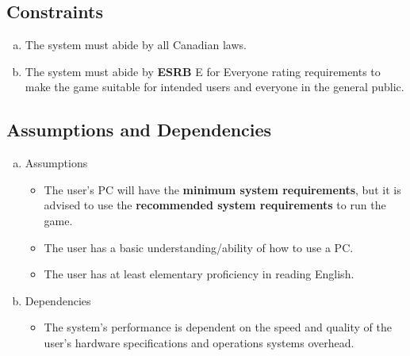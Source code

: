 \documentclass[]{article}
\begin{document}
\subsection{Constraints}
\label{sub:constraints}
\begin{enumerate}[a)]
	\item The system must abide by all Canadian laws.
	\item The system must abide by \textbf{ESRB} E for Everyone rating requirements to make the game suitable for intended users and everyone in the general public.
\end{enumerate}


\subsection{Assumptions and Dependencies}
\label{sub:assumptions_and_dependencies}


\begin{enumerate}[a)]
	\item Assumptions
	\begin{itemize}
		\item The user's PC will have the \textbf{minimum system requirements}, but it is advised to use the \textbf{recommended system requirements} to run the game.
		\item The user has a basic understanding/ability of how to use a PC.
		\item The user has at least elementary proficiency in reading English.
	\end{itemize}
	\item Dependencies
	\begin{itemize}
		\item The system's performance is dependent on the speed and quality of the user's hardware specifications and operations systems overhead.
	\end{itemize}
\end{enumerate}

\end{document}
